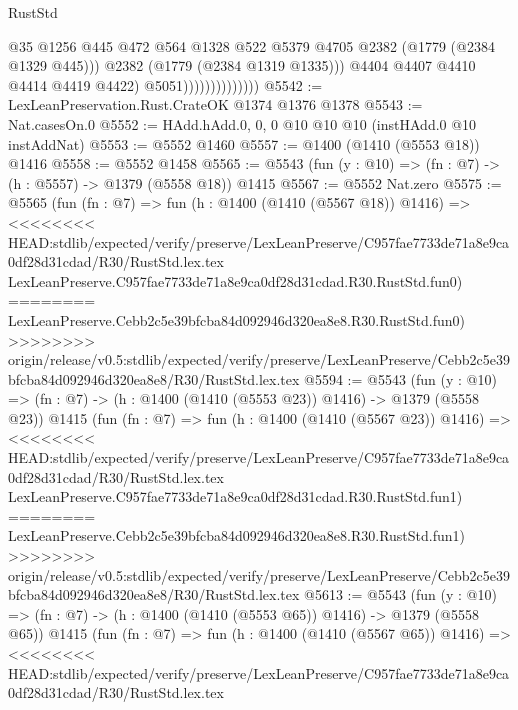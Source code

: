 \begin{lexlean}{RustStd}
\begin{coremodule}
{\begin{coremodule}
{{{{{{{{{{{                                      @35
                                      @1256
                                      @445
                                      @472
                                      @564
                                      @1328
                                      @522
                                      @5379
                                      @4705
                                      @2382
                                      (@1779 (@2384 @1329 @445)))
                                    @2382
                                    (@1779 (@2384 @1319 @1335)))
                                  @4404
                                  @4407
                                  @4410
                                  @4414
                                  @4419
                                  @4422)
                                @5051))))))))))))))
@5542 := LexLeanPreservation.Rust.CrateOK @1374 @1376 @1378
@5543 := Nat.casesOn.{0}
@5552 := HAdd.hAdd.{0, 0, 0} @10 @10 @10 (instHAdd.{0} @10 instAddNat)
@5553 := @5552 @1460
@5557 := @1400 (@1410 (@5553 @18)) @1416
@5558 := @5552 @1458
@5565 := @5543 (fun (y : @10) => (fn : @7) -> (h : @5557) -> @1379 (@5558 @18)) @1415
@5567 := @5552 Nat.zero
@5575 := @5565
    (fun (fn : @7) =>
    fun (h : @1400 (@1410 (@5567 @18)) @1416) =>
<<<<<<<< HEAD:stdlib/expected/verify/preserve/LexLeanPreserve/C957fae7733de71a8e9ca0df28d31cdad/R30/RustStd.lex.tex
    LexLeanPreserve.C957fae7733de71a8e9ca0df28d31cdad.R30.RustStd.fun0)
========
    LexLeanPreserve.Cebb2c5e39bfcba84d092946d320ea8e8.R30.RustStd.fun0)
>>>>>>>> origin/release/v0.5:stdlib/expected/verify/preserve/LexLeanPreserve/Cebb2c5e39bfcba84d092946d320ea8e8/R30/RustStd.lex.tex
@5594 := @5543
    (fun (y : @10) => (fn : @7) -> (h : @1400 (@1410 (@5553 @23)) @1416) -> @1379 (@5558 @23))
    @1415
    (fun (fn : @7) =>
    fun (h : @1400 (@1410 (@5567 @23)) @1416) =>
<<<<<<<< HEAD:stdlib/expected/verify/preserve/LexLeanPreserve/C957fae7733de71a8e9ca0df28d31cdad/R30/RustStd.lex.tex
    LexLeanPreserve.C957fae7733de71a8e9ca0df28d31cdad.R30.RustStd.fun1)
========
    LexLeanPreserve.Cebb2c5e39bfcba84d092946d320ea8e8.R30.RustStd.fun1)
>>>>>>>> origin/release/v0.5:stdlib/expected/verify/preserve/LexLeanPreserve/Cebb2c5e39bfcba84d092946d320ea8e8/R30/RustStd.lex.tex
@5613 := @5543
    (fun (y : @10) => (fn : @7) -> (h : @1400 (@1410 (@5553 @65)) @1416) -> @1379 (@5558 @65))
    @1415
    (fun (fn : @7) =>
    fun (h : @1400 (@1410 (@5567 @65)) @1416) =>
<<<<<<<< HEAD:stdlib/expected/verify/preserve/LexLeanPreserve/C957fae7733de71a8e9ca0df28d31cdad/R30/RustStd.lex.tex
}}}}}}}}}}}
\end{coremodule}}
\end{coremodule}
\end{lexlean}
